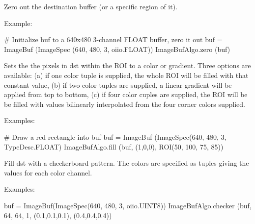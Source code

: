 Zero out the destination buffer (or a specific region of it).

\smallskip
\noindent Example:
\begin{code}
    # Initialize buf to a 640x480 3-channel FLOAT buffer, zero it out
    buf = ImageBuf (ImageSpec (640, 480, 3, oiio.FLOAT))
    ImageBufAlgo.zero (buf)
\end{code}
\apiend

 

Sets the the pixels in {\cf dst} within the ROI to a color or gradient.
Three options are available: (a) if one color tuple is supplied, the whole
ROI will be filled with that constant value, (b) if two color tuples are
supplied, a linear gradient will be applied from top to bottom, (c) if
four color cuples are supplied, the ROI will be be filled with values
bilinearly interpolated from the four corner colors supplied.

\smallskip
\noindent Examples:
\begin{code}
    # Draw a red rectangle into buf
    buf = ImageBuf (ImageSpec(640, 480, 3, TypeDesc.FLOAT)
    ImageBufAlgo.fill (buf, (1,0,0), ROI(50, 100, 75, 85))
\end{code}
\apiend


 

Fill {\cf dst} with a checkerboard pattern. The colors are specified as
tuples giving the values for each color channel.

\smallskip
\noindent Examples:
\begin{code}
    buf = ImageBuf(ImageSpec(640, 480, 3, oiio.UINT8))
    ImageBufAlgo.checker (buf, 64, 64, 1, (0.1,0.1,0.1), (0.4,0.4,0.4))
\end{code}
\apiend


 

